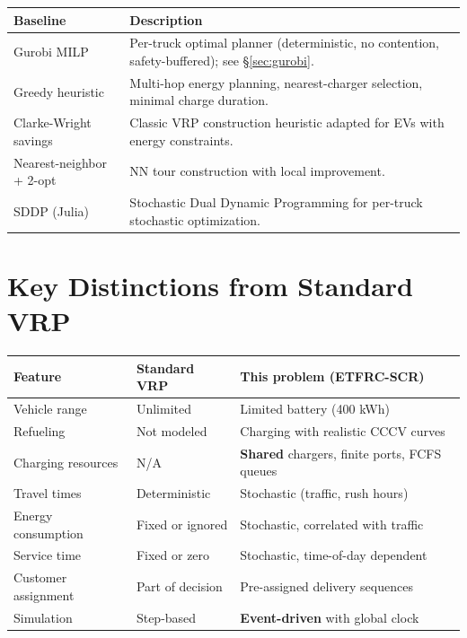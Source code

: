 \documentclass[11pt]{article}
\begin{document}
\begin{center}
\begin{tabular}{@{}lp{10cm}@{}}
\toprule
\textbf{Baseline} & \textbf{Description} \\
\midrule
Gurobi MILP & Per-truck optimal planner (deterministic, no contention, safety-buffered); see \S\ref{sec:gurobi}. \\
Greedy heuristic & Multi-hop energy planning, nearest-charger selection, minimal charge duration. \\
Clarke-Wright savings & Classic VRP construction heuristic adapted for EVs with energy constraints. \\
Nearest-neighbor + 2-opt & NN tour construction with local improvement. \\
SDDP (Julia) & Stochastic Dual Dynamic Programming for per-truck stochastic optimization. \\
\bottomrule
\end{tabular}
\end{center}

\section{Key Distinctions from Standard VRP}

\begin{center}
\begin{tabular}{@{}lll@{}}
\toprule
\textbf{Feature} & \textbf{Standard VRP} & \textbf{This problem (ETFRC-SCR)} \\
\midrule
Vehicle range & Unlimited & Limited battery (400 kWh) \\
Refueling & Not modeled & Charging with realistic CCCV curves \\
Charging resources & N/A & \textbf{Shared} chargers, finite ports, FCFS queues \\
Travel times & Deterministic & Stochastic (traffic, rush hours) \\
Energy consumption & Fixed or ignored & Stochastic, correlated with traffic \\
Service time & Fixed or zero & Stochastic, time-of-day dependent \\
Customer assignment & Part of decision & Pre-assigned delivery sequences \\
Simulation & Step-based & \textbf{Event-driven} with global clock \\
\bottomrule
\end{tabular}
\end{center}
\end{document}
